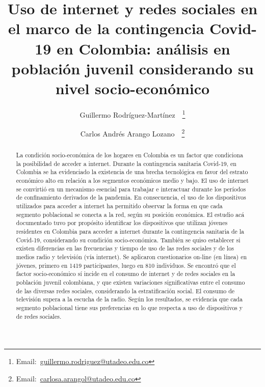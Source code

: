 \documentclass[spanish]{textolivre}
\title{Uso de internet y redes sociales en el marco de la contingencia Covid-19 en Colombia: análisis en población juvenil considerando su nivel socio-económico}
\author[1]{Guillermo Rodríguez-Martínez~\orcid{0000-0003-4329-5745}~\thanks{Email:~\url{guillermo.rodriguez@utadeo.edu.co}}}
\author[1]{Carlos Andrés Arango Lozano~\orcid{0000-0002-2786-3653}~\thanks{Email:~\url{carlosa.arangol@utadeo.edu.co}}}
\affil[1]{Universidad Jorge Tadeo Lozano, Bogotá, Colombia.}
\begin{document}
\maketitle

\begin{polyabstract}
\begin{abstract}
La condición socio-económica de los hogares en Colombia es un factor que condiciona la posibilidad de acceder a internet. Durante la contingencia sanitaria Covid-19, en Colombia se ha evidenciado la existencia de una brecha tecnológica en favor del estrato económico alto en relación a los segmentos económicos medio y bajo. El uso de internet se convirtió en un mecanismo esencial para trabajar e interactuar durante los períodos de confinamiento derivados de la pandemia. En consecuencia, el uso de los dispositivos utilizados para acceder a internet ha permitido observar la forma en que cada segmento poblacional se conecta a la red, según su posición económica. El estudio acá documentado tuvo por propósito identificar los dispositivos que utilizan jóvenes residentes en Colombia para acceder a internet durante la contingencia sanitaria de la Covid-19, considerando su condición socio-económica. También se quiso establecer si existen diferencias en las frecuencias y tiempo de uso de las redes sociales y de los medios radio y televisión (vía internet). Se aplicaron cuestionarios on-line (en línea) en jóvenes, primero en 1419 participantes, luego en 810 individuos. Se encontró que el factor socio-económico sí incide en el consumo de internet y de redes sociales en la población juvenil colombiana, y que existen variaciones significativas entre el consumo de las diversas redes sociales, considerando la estratificación social. El consumo de televisión supera a la escucha de la radio. Según los resultados, se evidencia que cada segmento poblacional tiene sus preferencias en lo que respecta a uso de dispositivos y de redes sociales.

\end{abstract}


\end{polyabstract}
\end{document}
